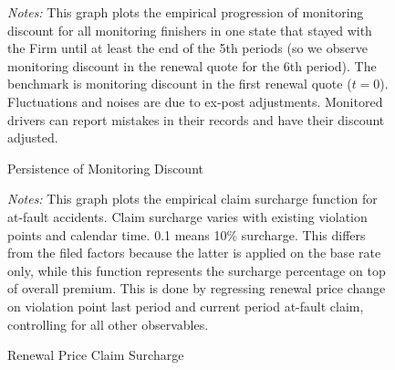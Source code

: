 \begin{figure}[H]
\centering
{}
\caption{Persistence of Monitoring Discount \label{fig:tm_disc_renw}}
\begin{minipage}{0.9\textwidth}
{\footnotesize \emph{Notes:} This graph plots the empirical progression of monitoring discount for all monitoring finishers in one state that stayed with the Firm until at least the end of the 5th periods (so we observe monitoring discount in the renewal quote for the 6th period). The benchmark is monitoring discount in the first renewal quote ($t=0$). Fluctuations and noises are due to ex-post adjustments. Monitored drivers can report mistakes in their records and have their discount adjusted. \par}
\end{minipage}
\end{figure}

\begin{figure}[H]
\centering
{}
\caption{Renewal Price Claim Surcharge \label{fig:clm_srchg}}
\begin{minipage}{0.9\textwidth}
{\footnotesize \emph{Notes:} This graph plots the empirical claim surcharge function for at-fault accidents. Claim surcharge varies with existing violation points and calendar time. 0.1 means 10\% surcharge. This differs from the filed factors because the latter is applied on the base rate only, while this function represents the surcharge percentage on top of overall premium. This is done by regressing renewal price change on violation point last period and current period at-fault claim, controlling for all other observables. \par}
\end{minipage}
\end{figure}

